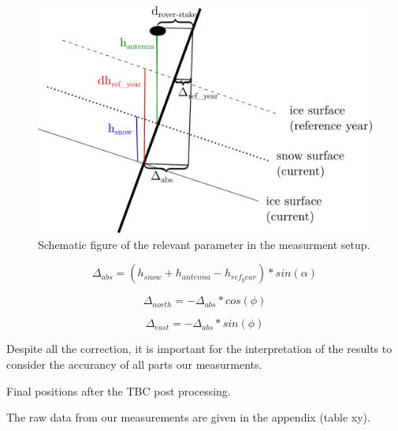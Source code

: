 \begin{figure}
\centering
\includegraphics[width=\linewidth]{../pictures/schematic_setup.pdf}
\caption{Schematic figure of the relevant parameter in the measurment setup.}
\end{figure}


\begin{equation}
	\Delta_{abs} = (h_{snow} + h_{antenna} - h_{ref_year}) * sin(\alpha)
\end{equation}

\begin{equation}
	\Delta_{north} = - \Delta_{abs} * cos(\phi)
\end{equation}

\begin{equation}
	\Delta_{east} = - \Delta_{abs} * sin(\phi)
\end{equation}

Despite all the correction, it is important for the interpretation of the results to consider the accurancy of all parts our measurments.

\begin{table}[h]
\caption{Final positions after the TBC post processing.}
\centering 

\end{table}

%

The raw data from our measurements are given in the appendix (table xy). 
%


